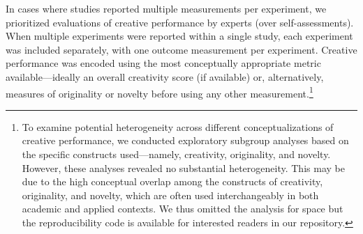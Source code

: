 \documentclass[manuscript, screen, review, acmsmall, anonymous]{acmart}
\begin{document}



In cases where studies reported multiple measurements per experiment, we prioritized evaluations of creative performance by experts (over self-assessments). When multiple experiments were reported within a single study, each experiment was included separately, with one outcome measurement per experiment. Creative performance was encoded using the most conceptually appropriate metric available---ideally an overall creativity score (if available) or, alternatively, measures of originality or novelty before using any other measurement.\footnote{To examine potential heterogeneity across different conceptualizations of creative performance, we conducted exploratory subgroup analyses based on the specific constructs used—namely, creativity, originality, and novelty. However, these analyses revealed no substantial heterogeneity. This may be due to the high conceptual overlap among the constructs of creativity, originality, and novelty, which are often used interchangeably in both academic and applied contexts. We thus omitted the analysis for space but the reproducibility code is available for interested readers in our repository.}

 
\end{document}
